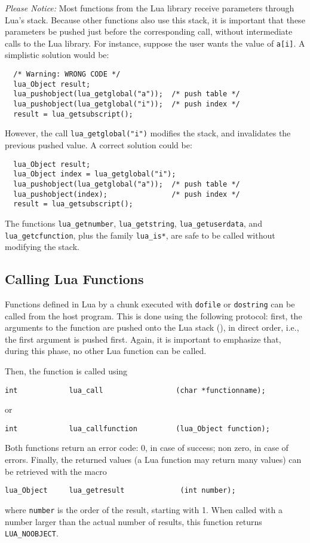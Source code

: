{\em Please Notice:\/}
Most functions from the Lua library receive parameters through Lua's stack.
Because other functions also use this stack,
it is important that these
parameters be pushed just before the corresponding call,
without intermediate calls to the Lua library.
For instance, suppose the user wants the value of \verb'a[i]'.
A simplistic solution would be:
\begin{verbatim}
  /* Warning: WRONG CODE */
  lua_Object result;
  lua_pushobject(lua_getglobal("a"));  /* push table */
  lua_pushobject(lua_getglobal("i"));  /* push index */
  result = lua_getsubscript();
\end{verbatim}
However, the call \verb'lua_getglobal("i")' modifies the stack,
and invalidates the previous pushed value.
A correct solution could be:
\begin{verbatim}
  lua_Object result;
  lua_Object index = lua_getglobal("i");
  lua_pushobject(lua_getglobal("a"));  /* push table */
  lua_pushobject(index);               /* push index */
  result = lua_getsubscript();
\end{verbatim}
The functions \verb|lua_getnumber|, \verb|lua_getstring|,
 \verb|lua_getuserdata|, and \verb|lua_getcfunction|,
plus the family \verb|lua_is*|,
are safe to be called without modifying the stack.

\subsection{Calling Lua Functions}
Functions defined in Lua by a chunk executed with
\verb'dofile' or \verb'dostring' can be called from the host program.
This is done using the following protocol:
first, the arguments to the function are pushed onto the Lua stack
(), in direct order, i.e., the first argument is pushed first.
Again, it is important to emphasize that, during this phase,
no other Lua function can be called.

Then, the function is called using
\begin{verbatim}
int            lua_call                 (char *functionname);
\end{verbatim}
or
\begin{verbatim}
int            lua_callfunction         (lua_Object function);
\end{verbatim}
Both functions return an error code:
0, in case of success; non zero, in case of errors.
Finally, the returned values (a Lua function may return many values)
can be retrieved with the macro
\begin{verbatim}
lua_Object     lua_getresult             (int number);
\end{verbatim}
where \verb'number' is the order of the result, starting with 1.
When called with a number larger than the actual number of results,
this function returns \verb'LUA_NOOBJECT'.


